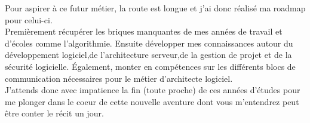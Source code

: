 	Pour aspirer à ce futur métier, la route est longue et j'ai donc réalisé ma roadmap pour celui-ci.\\

	Premièrement récupérer les briques manquantes de mes années de travail et d'écoles comme l'algorithmie.
	Ensuite développer mes connaissances autour du développement logiciel,de l'architecture serveur,de la gestion de projet et de la sécurité logicielle.
	Également, monter en compétences sur les différents blocs de communication nécessaires pour le métier d'architecte logiciel.\\

	J'attends donc avec impatience la fin (toute proche) de ces années d'études pour me plonger dans le coeur de cette nouvelle aventure dont vous m'entendrez peut être conter le récit un jour.